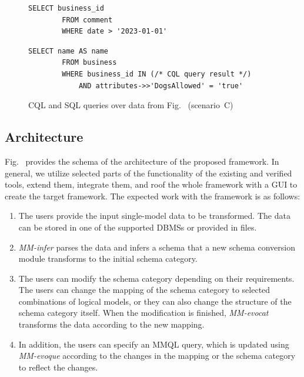 \begin{figure}[!htb]
    \begin{lstlisting}[language = SQL-fix]
        SELECT business_id
        FROM comment
        WHERE date > '2023-01-01'
    \end{lstlisting}
    
    \begin{lstlisting}[language = SQL-fix]
        SELECT name AS name
        FROM business
        WHERE business_id IN (/* CQL query result */)
            AND attributes->>'DogsAllowed' = 'true'
    \end{lstlisting}
    \caption{CQL and SQL queries over data from Fig.~ (scenario~C)}
\end{figure}


\subsection{Architecture}
Fig.~ provides the schema of the architecture of the proposed framework. In general, we utilize selected parts of the functionality of the existing and verified tools, extend them, integrate them, and roof the whole framework with a GUI to create the target framework. The expected work with the framework is as follows:

\begin{enumerate}
    \item The users provide the input single-model data to be transformed. The data can be stored in one of the supported DBMSs or provided in files. 
    \item \emph{MM-infer} parses the data and infers a schema that a new schema conversion module transforms to the initial schema category. %
    \item The users can modify the schema category depending on their requirements. 
    The users can change the mapping of the schema category to selected combinations of logical models, or they can also change the structure of the schema category itself. When the modification is finished, \emph{MM-evocat} transforms the data according to the new mapping. 
    \item In addition, %
    the users can specify an MMQL query, which is updated using \emph{MM-evoque} according to the changes in the mapping or the schema category to reflect the changes. 
\end{enumerate}


